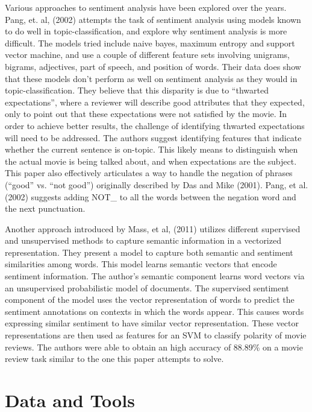 \documentclass[11pt,letterpaper]{article}
\begin{document}
Various approaches to sentiment analysis have been explored over the years. Pang, et. al, (2002) attempts the task of sentiment analysis using models known to do well in topic-classification, and explore why sentiment analysis is more difficult. The models tried include naive bayes, maximum entropy and support vector machine, and use a couple of different feature sets involving unigrams, bigrams, adjectives, part of speech, and position of words. Their data does show that these models don’t perform as well on sentiment analysis as they would in topic-classification. They believe that this disparity is due to “thwarted expectations”, where a reviewer will describe good attributes that they expected, only to point out that these expectations were not satisfied by the movie. In order to achieve better results, the challenge of identifying  thwarted expectations will need to be addressed. The authors suggest identifying features that indicate whether the current sentence is on-topic. This likely means to distinguish when the actual movie is being talked about, and when expectations are the subject. This paper also effectively articulates a way to handle the negation of phrases (“good” vs. “not good”) originally described by Das and Mike (2001). Pang, et al. (2002) suggests adding NOT\_ to all the words between the negation word and the next punctuation.   

Another approach introduced by Mass, et al, (2011) utilizes different supervised and unsupervised methods to capture semantic information in a vectorized representation. They present a model to capture both semantic and sentiment similarities among words. This model learns semantic vectors that encode sentiment information. The author’s semantic component learns word vectors via an unsupervised probabilistic model of documents. The supervised  sentiment component of the model uses the vector representation of words to predict the sentiment annotations on contexts in which the words appear. This causes words expressing  similar sentiment to have similar vector representation. These vector representations are then used as features for an SVM to classify polarity of movie reviews. The authors were able to obtain an high accuracy of 88.89\% on a movie review task similar to the one this paper attempts to solve.

\section{Data and Tools}
\end{document}
